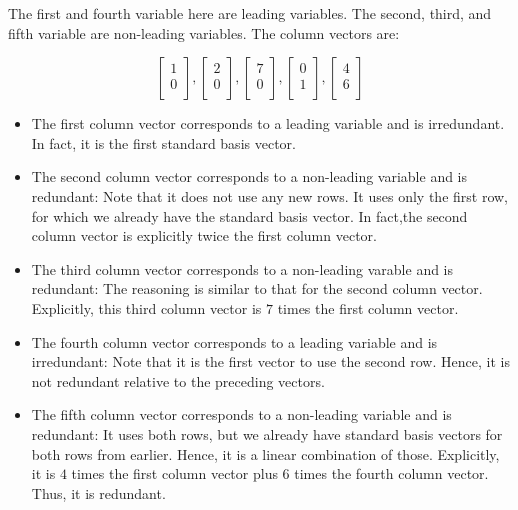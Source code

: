 \documentclass[10pt]{amsart}
\begin{document}
The first and fourth variable here are leading variables. The second,
third, and fifth variable are non-leading variables. The column vectors are:

$$\left[\begin{matrix} 1 \\ 0 \\\end{matrix}\right], \left[\begin{matrix} 2 \\ 0 \\\end{matrix}\right], \left[\begin{matrix} 7 \\ 0 \\\end{matrix}\right],\left[\begin{matrix} 0 \\ 1 \\\end{matrix}\right], \left[\begin{matrix} 4 \\ 6 \\\end{matrix}\right]$$

\begin{itemize}
\item The first column vector corresponds to a leading variable and is
  irredundant. In fact, it is the first standard basis vector.
\item The second column vector corresponds to a non-leading variable
  and is redundant: Note that it does not use any new rows. It uses
  only the first row, for which we already have the standard basis
  vector. In fact,the second column vector is explicitly twice the first column vector.
\item The third column vector corresponds to a non-leading varable and
  is redundant: The reasoning is similar to that for the second column
  vector. Explicitly, this third column vector is $7$ times the first
  column vector.
\item The fourth column vector corresponds to a leading variable and
  is irredundant: Note that it is the first vector to use the second
  row. Hence, it is not redundant relative to the preceding vectors.
\item The fifth column vector corresponds to a non-leading variable
  and is redundant: It uses both rows, but we already have standard
  basis vectors for both rows from earlier. Hence, it is a linear
  combination of those. Explicitly, it is $4$ times the first column
  vector plus $6$ times the fourth column vector. Thus, it is redundant.
\end{itemize}
\end{document}
